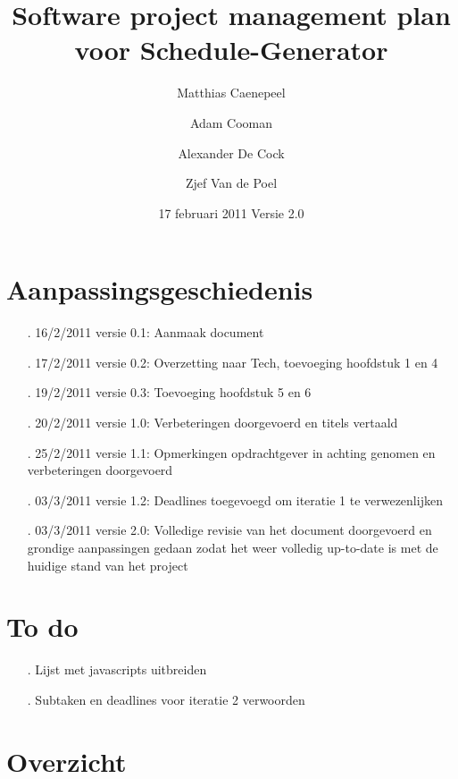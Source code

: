 \documentclass{article}
\title{Software project management plan voor Schedule-Generator}
\author{Matthias Caenepeel \and Adam Cooman \and Alexander De Cock \and Zjef Van de Poel}
\date{17 februari 2011 Versie 2.0}
\begin{document}
\maketitle

\newpage


\newpage


\newpage

\section*{Aanpassingsgeschiedenis}
\begin{itemize}
\item[.] 16/2/2011 versie 0.1: Aanmaak document
\item[.] 17/2/2011 versie 0.2: Overzetting naar Tech, toevoeging hoofdstuk 1 en 4
\item[.] 19/2/2011 versie 0.3: Toevoeging hoofdstuk 5 en 6
\item[.] 20/2/2011 versie 1.0: Verbeteringen doorgevoerd en titels vertaald
\item[.] 25/2/2011 versie 1.1: Opmerkingen opdrachtgever in achting genomen en verbeteringen doorgevoerd
\item[.] 03/3/2011 versie 1.2: Deadlines toegevoegd om iteratie 1 te verwezenlijken 
\item[.] 03/3/2011 versie 2.0: Volledige revisie van het document doorgevoerd en grondige aanpassingen gedaan zodat het weer volledig up-to-date is met de huidige stand van het project
\end{itemize}

\section*{To do}
\begin{itemize}
	\item[.] Lijst met javascripts uitbreiden
	\item[.] Subtaken en deadlines voor iteratie 2 verwoorden
\end{itemize}


\newpage
\tableofcontents

\newpage
\section{Overzicht}
\end{document}
